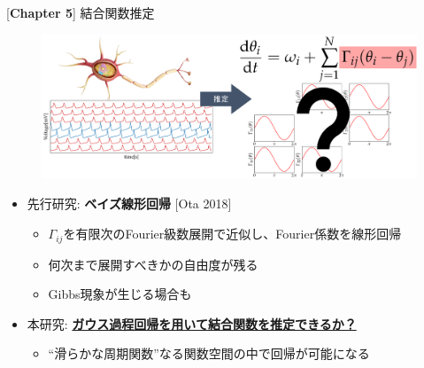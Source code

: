 
\begin{frame}{[\textbf{Chapter 5}] 結合関数推定}

\begin{figure}
  \centering
  \includegraphics[width=\textwidth]{figs/gp_coupling_ponchi.pdf}
\end{figure}

\begin{itemize}
  \item 先行研究: \textbf{ベイズ線形回帰} [Ota 2018]
  \begin{itemize}
    \item $\Gamma_{ij}$を有限次のFourier級数展開で近似し、Fourier係数を線形回帰
    \item 何次まで展開すべきかの自由度が残る
    \item Gibbs現象が生じる場合も
  \end{itemize}
  \item 本研究: \underline{\textbf{ガウス過程回帰を用いて結合関数を推定できるか？}}
  \begin{itemize}
    \item ``滑らかな周期関数''なる関数空間の中で回帰が可能になる
  \end{itemize}
\end{itemize}

\end{frame}

